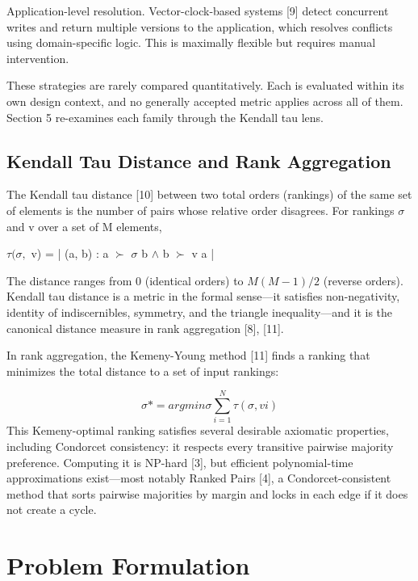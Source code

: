 \documentclass[journal]{IEEEtran}
\begin{document}
Application-level resolution. Vector-clock-based systems [9] detect concurrent writes and return multiple versions to the application, which resolves conflicts using domain-specific logic. This is maximally flexible but requires manual intervention.

These strategies are rarely compared quantitatively. Each is evaluated within its own design context, and no generally accepted metric applies across all of them. Section 5 re-examines each family through the Kendall tau lens.

\subsection{Kendall Tau Distance and Rank Aggregation}
The Kendall tau distance [10] between two total orders (rankings) of the same set of elements is the number of pairs whose relative order disagrees. For rankings $\sigma$ and v over a set of M elements,

$\tau(\sigma,$ v) = |{ (a, b) : a $\succ$ $\sigma$ b $\wedge$ b $\succ$ v a }|

The distance ranges from 0 (identical orders) to $M(M-1)/2$ (reverse orders). Kendall tau distance is a metric in the formal sense—it satisfies non-negativity, identity of indiscernibles, symmetry, and the triangle inequality—and it is the canonical distance measure in rank aggregation [8], [11].

In rank aggregation, the Kemeny-Young method [11] finds a ranking that minimizes the total distance to a set of input rankings:

\[ \sigma* = arg min \sigma \sum_{i=1}^{N} \tau(\sigma, v i) \]
This Kemeny-optimal ranking satisfies several desirable axiomatic properties, including Condorcet consistency: it respects every transitive pairwise majority preference. Computing it is NP-hard [3], but efficient polynomial-time approximations exist—most notably Ranked Pairs [4], a Condorcet-consistent method that sorts pairwise majorities by margin and locks in each edge if it does not create a cycle.

\section{Problem Formulation}
\end{document}
